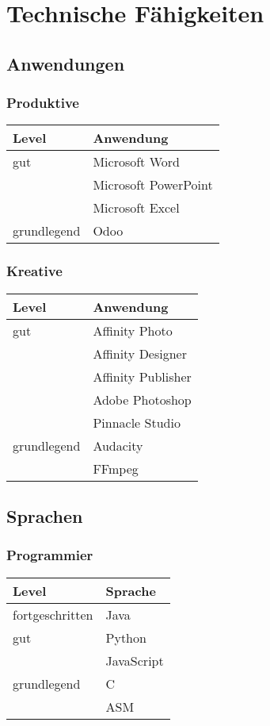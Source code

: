\documentclass{article}
\begin{document}
\section{Technische F\"ahigkeiten}
\begin{multicols}{2}
\subsection{Anwendungen}
\subsubsection{Produktive}
\begin{tabular}{| m{6em} | m{12em} |}
    \hline
    \textbf{Level} &  \textbf{Anwendung} \\
    \hline
    gut & Microsoft Word\\
    & Microsoft PowerPoint\\
    & Microsoft Excel\\
    \hline
    grundlegend & Odoo\\
    \hline
\end{tabular}

\subsubsection{Kreative}
\begin{tabular}{| m{6em} | m{12em} |}
    \hline
    \textbf{Level} &  \textbf{Anwendung} \\
    \hline
    gut & Affinity Photo\\
    & Affinity Designer\\
    & Affinity Publisher\\
    & Adobe Photoshop\\
    & Pinnacle Studio\\
    \hline
    grundlegend & Audacity\\
        & FFmpeg\\
    \hline
\end{tabular}
\subsection{Sprachen}

\subsubsection{Programmier}
\begin{tabular}{| m{6em} | m{12em} |}
    \hline
    \textbf{Level} &  \textbf{Sprache} \\
    \hline
    fortgeschritten & Java \\
    \hline
    gut & Python\\
    & JavaScript\\
    \hline
    grundlegend &  C\\
    & ASM \\
    \hline
\end{tabular}

\end{multicols}
\end{document}
